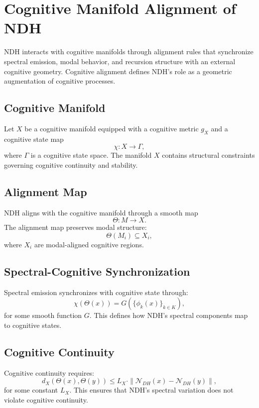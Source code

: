 \section{Cognitive Manifold Alignment of NDH}
\label{sec:ndh-cognitive-alignment}

NDH interacts with cognitive manifolds through alignment rules that synchronize
spectral emission, modal behavior, and recursion structure with an external
cognitive geometry. Cognitive alignment defines NDH's role as a geometric
augmentation of cognitive processes.

\subsection{Cognitive Manifold}

Let $X$ be a cognitive manifold equipped with a cognitive metric $g_X$ and a
cognitive state map
\[
\chi : X \to \Gamma,
\]
where $\Gamma$ is a cognitive state space. The manifold $X$ contains structural
constraints governing cognitive continuity and stability.

\subsection{Alignment Map}

NDH aligns with the cognitive manifold through a smooth map
\[
\Theta : M \to X.
\]
The alignment map preserves modal structure:
\[
\Theta(M_i) \subseteq X_i,
\]
where $X_i$ are modal-aligned cognitive regions.

\subsection{Spectral-Cognitive Synchronization}

Spectral emission synchronizes with cognitive state through:
\[
\chi(\Theta(x)) = G(\{\phi_k(x)\}_{k \in K}),
\]
for some smooth function $G$. This defines how NDH's spectral components map to
cognitive states.

\subsection{Cognitive Continuity}

Cognitive continuity requires:
\[
d_X(\Theta(x), \Theta(y))
  \le L_X \cdot \|\mathcal{N}_{DH}(x) - \mathcal{N}_{DH}(y)\|,
\]
for some constant $L_X$. This ensures that NDH's spectral variation does not
violate cognitive continuity.

